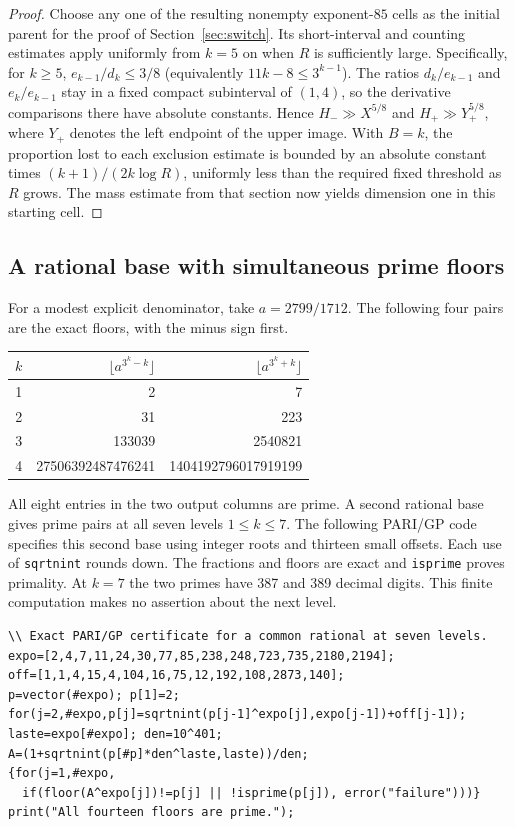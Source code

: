 \documentclass[11pt]{article}
\theoremstyle{remark}\newtheorem*{remark}{Remark}
\begin{document}
\begin{proof}
Choose any one of the resulting nonempty exponent-$85$ cells as the
initial parent for the proof of Section~\ref{sec:switch}. Its
short-interval and counting estimates apply uniformly from $k=5$ on
when $R$ is sufficiently large. Specifically, for $k\ge5$,
$e_{k-1}/d_k\le 3/8$ (equivalently $11k-8\le 3^{k-1}$).
The ratios $d_k/e_{k-1}$ and $e_k/e_{k-1}$ stay in a fixed compact
subinterval of $(1,4)$, so the derivative comparisons there have
absolute constants. Hence $H_-\gg X^{5/8}$ and $H_+\gg Y_+^{5/8}$,
where $Y_+$ denotes the left endpoint of the upper image.
With $B=k$, the proportion lost to each exclusion estimate is bounded
by an absolute constant times
$(k+1)/(2k\log R)$, uniformly less than the required fixed threshold
as $R$ grows. The mass estimate from that section now yields dimension
one in this starting cell.
\end{proof}

\subsection{A rational base with simultaneous prime floors}
For a modest explicit denominator, take $a=2799/1712$.
The following four pairs are the exact floors, with the minus sign first.
\begin{center}
\begin{tabular}{rrr}\toprule
$k$ & $\lfloor a^{3^k-k}\rfloor$ & $\lfloor a^{3^k+k}\rfloor$\\\midrule
1&2&7\\
2&31&223\\
3&133039&2540821\\
4&27506392487476241&1404192796017919199\\\bottomrule
\end{tabular}
\end{center}
All eight entries in the two output columns are prime. A second rational
base gives prime pairs at all seven levels $1\le k\le 7$.
The following PARI/GP code specifies this second base using integer roots
and thirteen small offsets. Each use of \texttt{sqrtnint} rounds down.
The fractions and floors are exact and \texttt{isprime} proves primality.
At $k=7$ the two primes have 387 and 389 decimal digits.
This finite computation makes no assertion about the next level.
{\small\begin{verbatim}
\\ Exact PARI/GP certificate for a common rational at seven levels.
expo=[2,4,7,11,24,30,77,85,238,248,723,735,2180,2194];
off=[1,1,4,15,4,104,16,75,12,192,108,2873,140];
p=vector(#expo); p[1]=2;
for(j=2,#expo,p[j]=sqrtnint(p[j-1]^expo[j],expo[j-1])+off[j-1]);
laste=expo[#expo]; den=10^401;
A=(1+sqrtnint(p[#p]*den^laste,laste))/den;
{for(j=1,#expo,
  if(floor(A^expo[j])!=p[j] || !isprime(p[j]), error("failure")))}
print("All fourteen floors are prime.");
\end{verbatim}}
\end{document}
